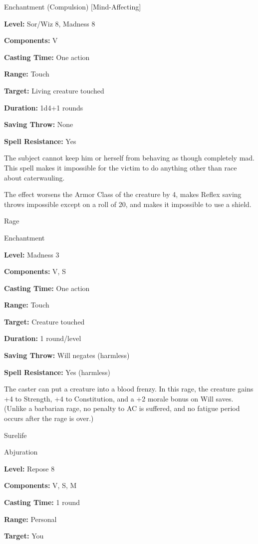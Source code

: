 \documentclass{article}
\begin{document}
Enchantment (Compulsion) [Mind-Affecting]

\textbf{Level:} Sor/Wiz 8, Madness 8

\textbf{Components:} V

\textbf{Casting Time:} One action

\textbf{Range:} Touch

\textbf{Target:} Living creature touched

\textbf{Duration:} 1d4+1 rounds

\textbf{Saving Throw:} None

\textbf{Spell Resistance:} Yes

The subject cannot keep him or herself from behaving as though completely mad. 
This spell makes it impossible for the victim to do anything other than race about 
caterwauling.

The effect worsens the Armor Class of the creature by 4, makes Reflex saving throws 
impossible except on a roll of 20, and makes it impossible to use a shield.

\vspace{12pt}
Rage

Enchantment

\textbf{Level:} Madness 3

\textbf{Components:} V, S

\textbf{Casting Time:} One action

\textbf{Range:} Touch

\textbf{Target:} Creature touched

\textbf{Duration:} 1 round/level

\textbf{Saving Throw:} Will negates (harmless)

\textbf{Spell Resistance:} Yes (harmless)

The caster can put a creature into a blood frenzy. In this rage, the creature gains 
+4 to Strength, +4 to Constitution, and a +2 morale bonus on Will saves. (Unlike 
a barbarian rage, no penalty to AC is suffered, and no fatigue period occurs after 
the rage is over.)

\vspace{12pt}
Surelife

Abjuration

\textbf{Level:} Repose 8

\textbf{Components:} V, S, M

\textbf{Casting Time:} 1 round

\textbf{Range:} Personal

\textbf{Target:} You
\end{document}
